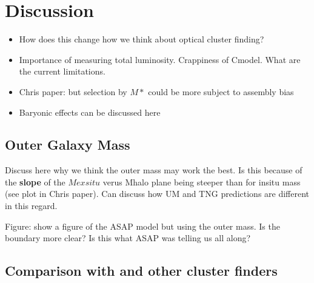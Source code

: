 \documentclass[a4paper,fleqn,usenatbib]{mnras}
\begin{document}

    

\section{Discussion}
    \label{sec:discussion}

\begin{itemize}
    \item How does this change how we think about optical cluster finding?
    \item Importance of measuring total luminosity. Crappiness of Cmodel. What are the current limitations.
    \item Chris paper: but selection by $M*$ could be more subject to assembly bias
    \item Baryonic effects can be discussed here
\end{itemize}


\subsection{Outer Galaxy Mass}

Discuss here why we think the outer mass may work the best. Is this because of the \textbf{slope} of the $Mexsitu$ verus Mhalo plane being steeper than for insitu mass (see plot in Chris paper). Can discuss how UM and TNG predictions are different in this regard.

Figure: show a figure of the ASAP model but using the outer mass. Is the boundary more clear? Is this what ASAP was telling us all along?

\subsection{Comparison with \redm{} and other cluster finders}
    \label{sec:redmapper}

    
\end{document}
